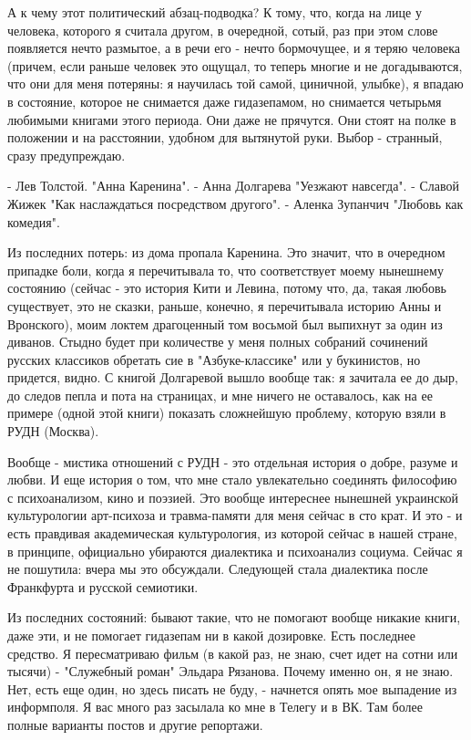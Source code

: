 А к чему этот политический абзац-подводка? К тому, что, когда на лице у
человека, которого я считала другом, в очередной, сотый, раз при этом слове
появляется нечто размытое, а в речи его - нечто бормочущее, и я теряю человека
(причем, если раньше человек это ощущал, то теперь многие и не догадываются,
что они для меня потеряны: я научилась той самой, циничной, улыбке), я впадаю в
состояние, которое не снимается даже гидазепамом, но снимается четырьмя
любимыми книгами этого периода. Они даже не прячутся. Они стоят на полке в
положении и на расстоянии, удобном для вытянутой руки. Выбор - странный, сразу
предупреждаю. 

- Лев Толстой. "Анна Каренина".
- Анна Долгарева "Уезжают навсегда". 
- Славой Жижек "Как наслаждаться посредством другого".
- Аленка Зупанчич "Любовь как комедия".

Из последних потерь: из дома пропала Каренина. Это значит, что в очередном
припадке боли, когда я перечитывала то, что соответствует моему нынешнему
состоянию (сейчас - это история Кити и Левина, потому что, да, такая любовь
существует, это не сказки, раньше, конечно, я перечитывала историю Анны и
Вронского), моим локтем  драгоценный том восьмой был выпихнут за один из
диванов. Стыдно будет при количестве у меня полных собраний сочинений русских
классиков обретать сие в "Азбуке-классике" или у букинистов, но придется,
видно. С книгой Долгаревой вышло вообще так: я зачитала ее до дыр, до следов
пепла и пота на страницах, и мне ничего не оставалось, как на ее примере (одной
этой книги) показать сложнейшую проблему, которую взяли в РУДН (Москва).

Вообще - мистика отношений с РУДН - это отдельная история о добре, разуме и
любви. И еще история о том, что мне стало увлекательно соединять философию с
психоанализом, кино и поэзией. Это вообще интереснее нынешней украинской
культурологии арт-психоза и травма-памяти для меня сейчас в сто крат. И это - и
есть правдивая академическая культурология, из которой сейчас в нашей стране, в
принципе, официально убираются диалектика и психоанализ социума. Сейчас я не
пошутила: вчера мы это обсуждали. Следующей стала диалектика после Франкфурта и
русской семиотики. 

Из последних состояний: бывают такие, что не помогают вообще никакие книги,
даже эти, и не помогает гидазепам ни в какой дозировке. Есть последнее
средство. Я пересматриваю фильм (в какой раз, не знаю, счет идет на сотни или
тысячи) - "Служебный роман" Эльдара Рязанова. Почему именно он, я не знаю. Нет,
есть еще один, но здесь писать не буду, - начнется опять мое выпадение из
информполя. Я вас много раз засылала ко мне в Телегу и в ВК. Там более полные
варианты постов и другие репортажи.

